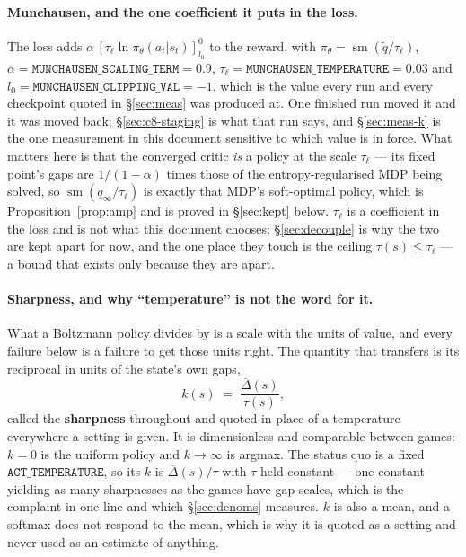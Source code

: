 \documentclass{article}
\DeclareMathOperator{\sm}{sm}
\newcommand{\gapbar}{\overline{\Delta}}
\begin{document}
\paragraph{Munchausen, and the one coefficient it puts in the loss.} The loss adds
$\alpha\,[\tau_\ell \ln \pi_\theta(a_t|s_t)]_{l_0}^{0}$ to the reward, with
$\pi_\theta = \sm(\tilde{q}/\tau_\ell)$,
$\alpha = \texttt{MUNCHAUSEN\_SCALING\_TERM} = 0.9$,
$\tau_\ell = \texttt{MUNCHAUSEN\_TEMPERATURE} = 0.03$ and
$l_0 = \texttt{MUNCHAUSEN\_CLIPPING\_VAL} = -1$, which is the value every run and every checkpoint
quoted in \S\ref{sec:meas} was produced at. One finished run moved it and it was moved back;
\S\ref{sec:c8-staging} is what that run says, and \S\ref{sec:meas-k} is the one measurement in
this document sensitive to which value is in force. What matters here is that the converged
critic
\emph{is} a policy at the scale $\tau_\ell$ --- its fixed point's gaps are $1/(1-\alpha)$ times
those of the entropy-regularised MDP being solved, so $\sm(q_\infty/\tau_\ell)$ is exactly that
MDP's soft-optimal policy, which is Proposition~\ref{prop:amp} and is proved in
\S\ref{sec:kept} below. $\tau_\ell$ is a coefficient
in the loss and is not what this document chooses; \S\ref{sec:decouple} is why the two are kept
apart for now, and the one place they touch is the ceiling $\tau(s) \le \tau_\ell$ --- a bound
that exists only because they are apart.

\paragraph{Sharpness, and why ``temperature'' is not the word for it.} What a Boltzmann policy
divides by is a scale with the units of value, and every failure below is a failure to get those
units right. The quantity that transfers is its reciprocal in units of the state's own gaps,
\[
  k(s) \;=\; \frac{\gapbar(s)}{\tau(s)},
\]
called the \textbf{sharpness} throughout and quoted in place of a temperature everywhere a
setting is given. It is dimensionless and comparable between games: $k = 0$ is the uniform policy
and $k \to \infty$ is argmax. The status quo is a fixed $\texttt{ACT\_TEMPERATURE}$, so its $k$ is
$\gapbar(s)/\tau$ with $\tau$ held constant --- one constant yielding as many sharpnesses as the
games have gap scales, which is the complaint in one line and which \S\ref{sec:denoms} measures.
$k$ is also a mean, and a softmax does not respond to the mean, which is why it is quoted as a
setting and never used as an estimate of anything.
\end{document}
